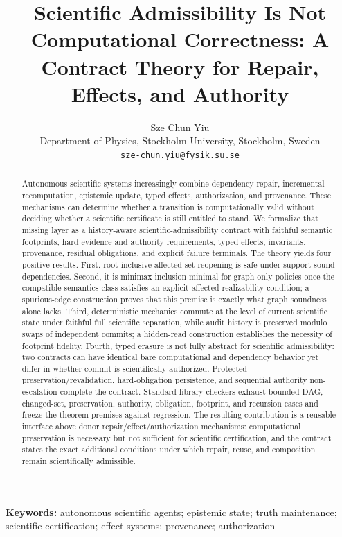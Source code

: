 \documentclass[11pt]{article}
\title{Scientific Admissibility Is Not Computational Correctness: A Contract Theory for Repair, Effects, and Authority}
\author{Sze Chun Yiu\\Department of Physics, Stockholm University, Stockholm, Sweden\\\texttt{sze-chun.yiu@fysik.su.se}}
\date{}
\begin{document}
\maketitle

\begin{abstract}
Autonomous scientific systems increasingly combine dependency repair, incremental recomputation, epistemic update, typed effects, authorization, and provenance. These mechanisms can determine whether a transition is computationally valid without deciding whether a scientific certificate is still entitled to stand. We formalize that missing layer as a history-aware scientific-admissibility contract with faithful semantic footprints, hard evidence and authority requirements, typed effects, invariants, provenance, residual obligations, and explicit failure terminals. The theory yields four positive results. First, root-inclusive affected-set reopening is safe under support-sound dependencies. Second, it is minimax inclusion-minimal for graph-only policies once the compatible semantics class satisfies an explicit affected-realizability condition; a spurious-edge construction proves that this premise is exactly what graph soundness alone lacks. Third, deterministic mechanics commute at the level of current scientific state under faithful full scientific separation, while audit history is preserved modulo swaps of independent commits; a hidden-read construction establishes the necessity of footprint fidelity. Fourth, typed erasure is not fully abstract for scientific admissibility: two contracts can have identical bare computational and dependency behavior yet differ in whether commit is scientifically authorized. Protected preservation/revalidation, hard-obligation persistence, and sequential authority non-escalation complete the contract. Standard-library checkers exhaust bounded DAG, changed-set, preservation, authority, obligation, footprint, and recursion cases and freeze the theorem premises against regression. The resulting contribution is a reusable interface above donor repair/effect/authorization mechanisms: computational preservation is necessary but not sufficient for scientific certification, and the contract states the exact additional conditions under which repair, reuse, and composition remain scientifically admissible.
\end{abstract}

\noindent\textbf{Keywords:} autonomous scientific agents; epistemic state; truth maintenance; scientific certification; effect systems; provenance; authorization
\end{document}
